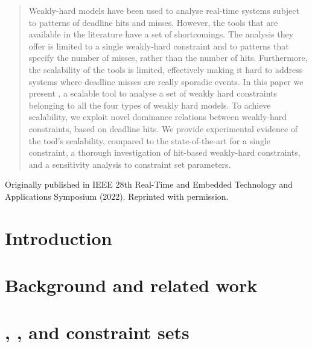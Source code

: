 \renewcommand\thisdir{papers/rtas22b}
\renewcommand\figdir{\thisdir/figs}




\begin{abstract}
    Weakly-hard models have been used to analyse real-time systems subject to patterns of deadline hits and misses.
    However, the tools that are available in the literature have a set of shortcomings.
    The analysis they offer is limited to a single weakly-hard constraint and to patterns that specify the number of misses, rather than the number of hits.
    Furthermore, the scalability of the tools is limited, effectively making it hard to address systems where deadline misses are really sporadic events.
    In this paper we present \tool{}, a scalable tool to analyse a set of weakly hard constraints belonging to all the four types of weakly hard models.
    To achieve scalability, we exploit novel dominance relations between weakly-hard constraints, based on deadline hits.
    We provide experimental evidence of the tool's scalability, compared to the state-of-the-art for a single constraint, a thorough investigation of hit-based weakly-hard constraints, and a sensitivity analysis to constraint set parameters.
\end{abstract}

\vfill
Originally published in IEEE 28th Real-Time and Embedded Technology and Applications Symposium (2022). 
Reprinted with permission.
\newpage

\section{Introduction}
\label{sec:intro}


\section{Background and related work}
\label{sec:background}


\section{\tAH{}, \tRH{}, and constraint sets}
\label{sec:theorems}


